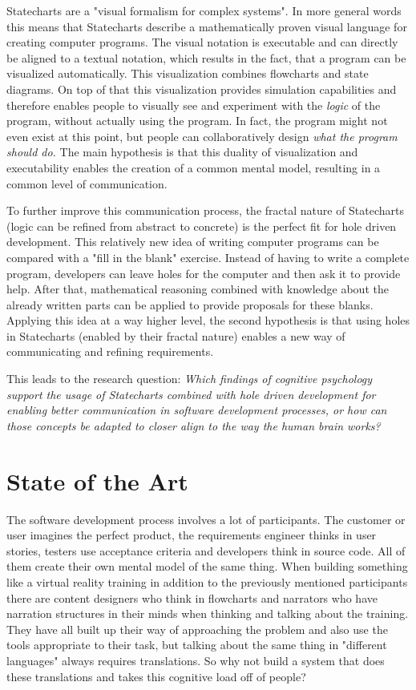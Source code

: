 \documentclass[a4paper, bibliography=totoc, oneside, 12pt]{scrbook}
\begin{document}
Statecharts \autocite{harel_statecharts:_1987} are a "visual formalism for complex systems". In more general words this means that Statecharts describe a mathematically proven visual language for creating computer programs. The visual notation is executable and can directly be aligned to a textual notation, which results in the fact, that a program can be visualized automatically. This visualization combines flowcharts and state diagrams. On top of that this visualization provides simulation capabilities and therefore enables people to visually see and experiment with the \emph{logic} of the program, without actually using the program. In fact, the program might not even exist at this point, but people can collaboratively design \emph{what the program should do.} The main hypothesis is that this duality of visualization and executability enables the creation of a common mental model, resulting in a common level of communication.

To further improve this communication process, the fractal nature of Statecharts (logic can be refined from abstract to concrete) is the perfect fit for hole driven development. This relatively new idea of writing computer programs can be compared with a "fill in the blank" exercise. Instead of having to write a complete program, developers can leave holes for the computer and then ask it to provide help. After that, mathematical reasoning combined with knowledge about the already written parts can be applied to provide proposals for these blanks. Applying this idea at a way higher level, the second hypothesis is that using holes in Statecharts (enabled by their fractal nature) enables a new way of communicating and refining requirements.

This leads to the research question: \emph{Which findings of cognitive psychology support the usage of Statecharts combined with hole driven development for enabling better communication in software development processes, or how can those concepts be adapted to closer align to the way the human brain works?}



\section{State of the Art}
\label{sec:state-of-the-art}
The software development process involves a lot of participants. The customer or user imagines the perfect product, the requirements engineer thinks in user stories, testers use acceptance criteria and developers think in source code. All of them create their own mental model of the same thing. When building something like a virtual reality training in addition to the previously mentioned participants there are content designers who think in flowcharts and narrators who have narration structures in their minds when thinking and talking about the training.
They have all built up their way of approaching the problem and also use the tools appropriate to their task, but talking about the same thing in "different languages" always requires translations. So why not build a system that does these translations and takes this cognitive load off of people?
\end{document}
